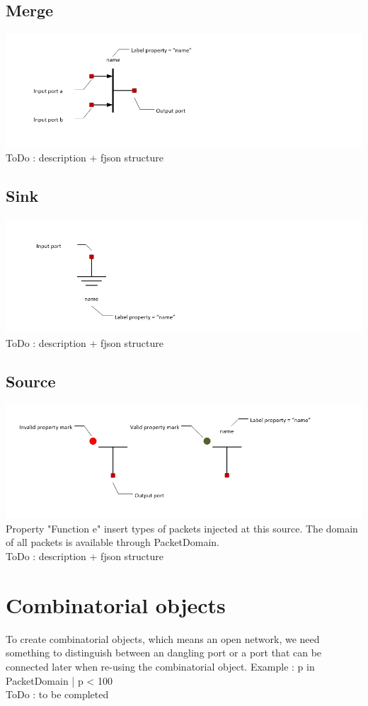 \documentclass[a4paper,11pt,final]{article}
\begin{document}
\subsection{Merge}
\includegraphics[width=1.0\textwidth]{merge}
\\ToDo : description + fjson structure
\subsection{Sink}
\includegraphics[width=1.0\textwidth]{sink}
\\ToDo : description + fjson structure
\subsection{Source}
\includegraphics[width=1.0\textwidth]{source}
\\Property "Function e" insert types of packets injected at this source. The domain of all packets is available through PacketDomain. 
\\ToDo : description + fjson structure

\newpage
\section{Combinatorial objects}
To create combinatorial objects, which means an open network, we need something to distinguish between an dangling port or a port that can be connected later when re-using the combinatorial object. Example : {p in PacketDomain | p < 100}
\\ToDo : to be completed
\end{document}
